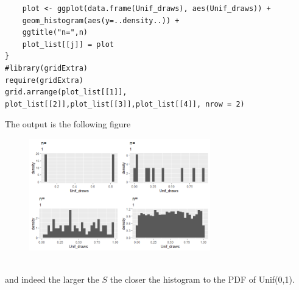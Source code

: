\begin{Solution}{1.29}
\begin{verbatim}
	plot <- ggplot(data.frame(Unif_draws), aes(Unif_draws)) +
	geom_histogram(aes(y=..density..)) +
	ggtitle("n=",n)
	plot_list[[j]] = plot
}
#library(gridExtra)
require(gridExtra)
grid.arrange(plot_list[[1]], plot_list[[2]],plot_list[[3]],plot_list[[4]], nrow = 2)
  \end{verbatim}
 The output is the following figure~\\
 \begin{figure}[htbp!]
 	\includegraphics[width=0.7\textwidth]{0}
 \end{figure}  		   ~\\
 and indeed the larger the $S$ the closer the histogram to the PDF of Unif(0,1).\\~\\~\\


\end{Solution}
